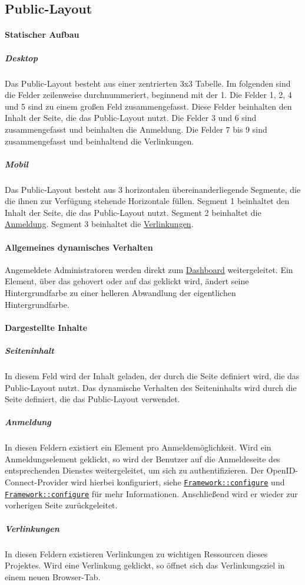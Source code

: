 \subsection{Public-Layout}\label{AP_Public_Layout}

\paragraph*{Statischer Aufbau}
\subparagraph*{Desktop}
Das Public-Layout besteht aus einer zentrierten 3x3 Tabelle.
Im folgenden sind die Felder zeilenweise durchnummeriert, beginnend mit der 1.
Die Felder 1, 2, 4 und 5 sind zu einem großen Feld zusammengefasst. Diese Felder beinhalten den Inhalt der Seite, die das Public-Layout nutzt. 
Die Felder 3 und 6 sind zusammengefasst und beinhalten die Anmeldung.
Die Felder 7 bis 9 sind zusammengefasst und beinhaltend die Verlinkungen.

\subparagraph*{Mobil}
Das Public-Layout besteht aus 3 horizontalen übereinanderliegende Segmente, die die ihnen zur Verfügung stehende Horizontale füllen.
Segment 1 beinhaltet den Inhalt der Seite, die das Public-Layout nutzt. 
Segment 2 beinhaltet die \hyperref[AP_Public_Layout_Anmeldung]{Anmeldung}.
Segment 3 beinhaltet die \hyperref[AP_Public_Layout_Verlinkungen]{Verlinkungen}.

\paragraph*{Allgemeines dynamisches Verhalten}
Angemeldete Administratoren werden direkt zum \hyperref[AP_Dashboard]{Dashboard} weitergeleitet.
Ein Element, über das gehovert oder auf das geklickt wird, ändert seine Hintergrundfarbe zu einer helleren Abwandlung der eigentlichen Hintergrundfarbe.

\paragraph*{Dargestellte Inhalte}
\subparagraph*{Seiteninhalt}
In diesem Feld wird der Inhalt geladen, der durch die Seite definiert wird, die das Public-Layout nutzt.
Das dynamische Verhalten des Seiteninhalts wird durch die Seite definiert, die das Public-Layout verwendet.

\subparagraph*{Anmeldung}\label{AP_Public_Layout_Anmeldung}
In diesen Feldern existiert ein Element pro Anmeldemöglichkeit.
Wird ein Anmeldungselement geklickt, so wird der Benutzer auf die Anmeldeseite des entsprechenden Dienstes weitergeleitet, um sich zu authentifizieren.
Der OpenID-Connect-Provider wird hierbei konfiguriert, siehe \hyperref[AP_Framework_login]{\texttt{Framework::configure}} und \hyperref[AP_Framework_configure]{\texttt{Framework::configure}} für mehr Informationen.
Anschließend wird er wieder zur vorherigen Seite zurückgeleitet.

\subparagraph*{Verlinkungen}\label{AP_Public_Layout_Verlinkungen}
In diesen Feldern existieren Verlinkungen zu wichtigen Ressourcen dieses Projektes.
Wird eine Verlinkung geklickt, so öffnet sich das Verlinkungsziel in einem neuen Browser-Tab.
